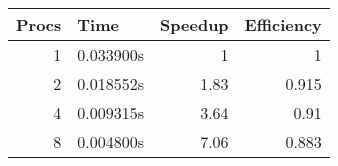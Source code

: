 \documentclass[10pt,a4paper]{article}
\begin{document}
\begin{tabular}{rlrr}
Procs & Time & Speedup & Efficiency\\
\hline
1 & 0.033900s & 1 & 1\\
2 & 0.018552s & 1.83 & 0.915\\
4 & 0.009315s & 3.64 & 0.91\\
8 & 0.004800s & 7.06 & 0.883\\
\end{tabular}
\begin{comment}
#+ORGTBL: SEND exercise-5-inner orgtbl-to-latex :splice nil :skip 0
| Procs | Time      | Speedup | Efficiency |
|-------+-----------+---------+------------|
|     1 | 0.033900s |       1 |          1 |
|     2 | 0.018552s |    1.83 |      0.915 |
|     4 | 0.009315s |    3.64 |       0.91 |
|     8 | 0.004800s |    7.06 |      0.883 |
\end{comment}
\end{document}
